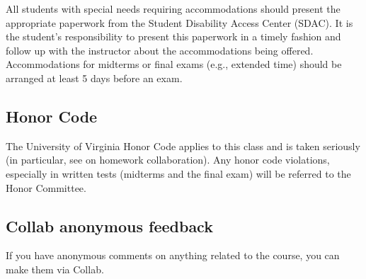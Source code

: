 \documentclass[oneside,11pt]{amsart}
\begin{document}
All students with special needs requiring accommodations should present the
appropriate paperwork from the Student Disability Access Center (SDAC). It is
the student's responsibility to present this paperwork in a timely fashion and
follow up with the instructor about the accommodations being offered.
Accommodations for midterms or final exams (e.g., extended time) should be arranged at
least 5 days before an exam.

\subsection{Honor Code} The University of Virginia Honor Code applies to this
class and is taken seriously (in particular, 
see  on homework collaboration).
Any honor code violations,
especially in written tests (midterms and the final exam)
will be referred to the
Honor Committee.

\subsection{Collab anonymous feedback}
If you have anonymous comments on anything related to the course, you can make
them via Collab.
\end{document}
